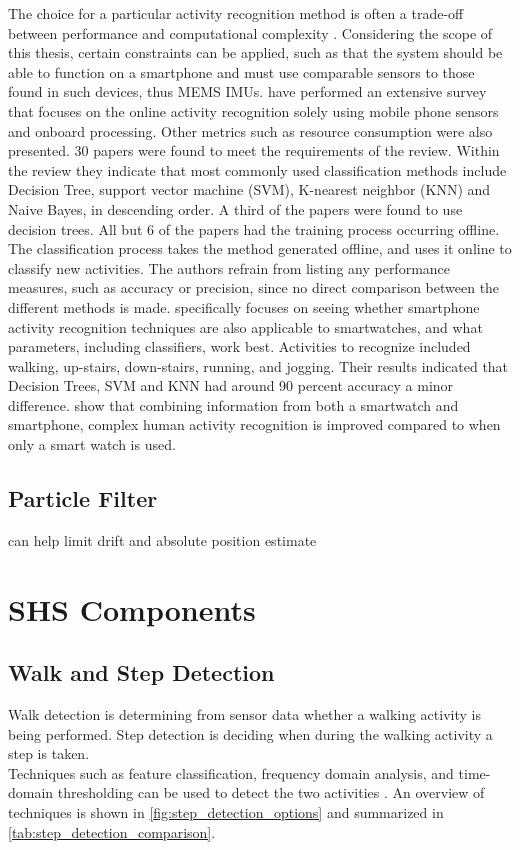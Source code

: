
The choice for a particular activity recognition method is often a trade-off between performance and computational complexity \cite{Bulling2014}. Considering the scope of this thesis, certain constraints can be applied, such as that the system should be able to function on a smartphone and must use comparable sensors to those found in such devices, thus MEMS IMUs. \citet{Shoaib2015} have performed an extensive survey that focuses on the online activity recognition solely using mobile phone sensors and onboard processing. Other metrics such as resource consumption were also presented. 30 papers were found to meet the requirements of the review. Within the review they indicate that most commonly used classification methods include Decision Tree, support vector machine (SVM), K-nearest neighbor (KNN) and Naive Bayes, in descending order. A third of the papers were found to use decision trees. All but 6 of the papers had the training process occurring offline. The classification process takes the method generated offline, and uses it online to classify new activities. The authors refrain from listing any performance measures, such as accuracy or precision, since no direct comparison between the different methods is made. \citet{Ahmad2020} specifically focuses on seeing whether smartphone activity recognition techniques are also applicable to smartwatches, and what parameters, including classifiers, work best. Activities to recognize included walking, up-stairs, down-stairs, running, and jogging. Their results indicated that  Decision Trees, SVM and KNN had around 90 percent accuracy a minor difference. \citet{Shoaib2016} show that combining information from both a smartwatch and smartphone, complex human activity recognition is improved compared to when only a smart watch is used. 

\subsection{Particle Filter}
\citet{Harle2013} can help limit drift and absolute position estimate

\section{SHS Components}
\subsection{Walk and Step Detection}
\label{sec:rw - step detection}
Walk detection is determining from sensor data whether a walking activity is being performed. Step detection is deciding when during the walking activity a step is taken. \\
Techniques such as feature classification, frequency domain analysis, and time-domain thresholding can be used to detect the two activities \cite{Yang2014}. An overview of techniques  is  shown in \cref{fig:step_detection_options} and summarized in \cref{tab:step_detection_comparison}. %

